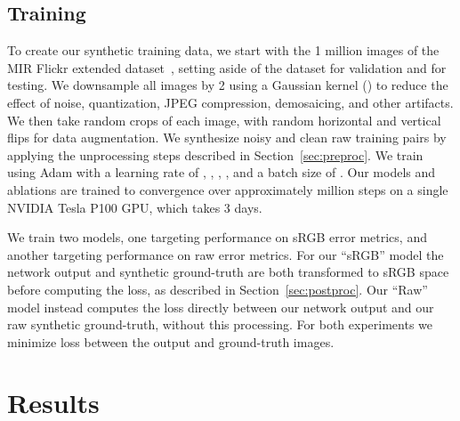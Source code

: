 \documentclass[10pt,twocolumn,letterpaper]{article}
\begin{document}
\subsection{Training}
\label{sec:training}

To create our synthetic training data, we start with the 1 million images of the MIR Flickr extended dataset~\cite{huiskes10mir}, setting aside  of the dataset for validation and  for testing. We downsample all images by 2 using a Gaussian kernel () to reduce the effect of noise, quantization, JPEG compression, demosaicing, and other artifacts. We then take random  crops of each image, with random horizontal and vertical flips for data augmentation. We synthesize noisy and clean raw training pairs by applying the unprocessing steps described in Section~\ref{sec:preproc}.
We train using Adam \cite{KingmaB14} with a learning rate of , , , , and a batch size of . Our models and ablations are trained to convergence over approximately  million steps on a single NVIDIA Tesla P100 GPU, which takes 3 days.

We train two models, one targeting performance on sRGB error metrics, and another targeting performance on raw error metrics. For our ``sRGB'' model the network output and synthetic ground-truth are both transformed to sRGB space before computing the loss, as described in Section~\ref{sec:postproc}. Our ``Raw'' model instead computes the loss directly between our network output and our raw synthetic ground-truth, without this processing. For both experiments we minimize  loss between the output and ground-truth images.





\section{Results}
\label{sec:results}
\end{document}
